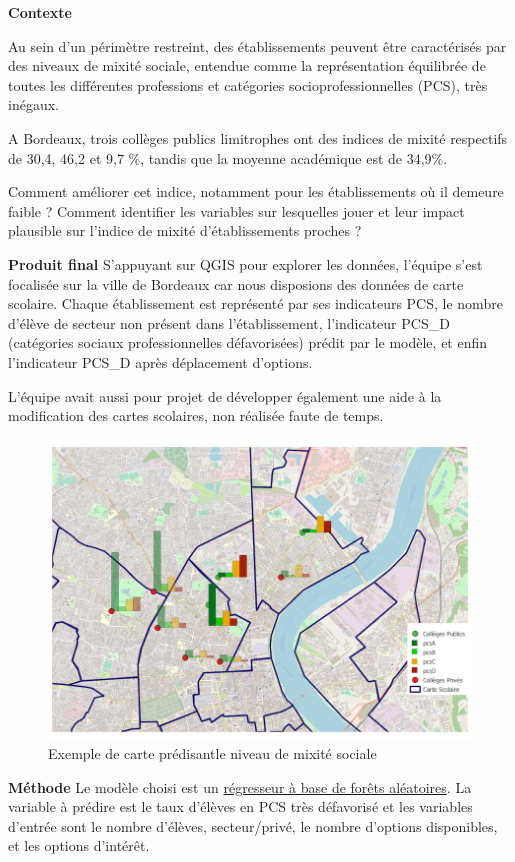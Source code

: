 \documentclass[]{book}
\begin{document}
\textbf{Contexte}

Au sein d'un périmètre restreint, des établissements peuvent être
caractérisés par des niveaux de mixité sociale, entendue comme la
représentation équilibrée de toutes les différentes professions et
catégories socioprofessionnelles (PCS), très inégaux.

A Bordeaux, trois collèges publics limitrophes ont des indices de mixité
respectifs de 30,4, 46,2 et 9,7 \%, tandis que la moyenne académique est
de 34,9\%.

Comment améliorer cet indice, notamment pour les établissements où il
demeure faible ? Comment identifier les variables sur lesquelles jouer
et leur impact plausible sur l'indice de mixité d'établissements proches
?

\textbf{Produit final} S'appuyant sur QGIS pour explorer les données,
l'équipe s'est focalisée sur la ville de Bordeaux car nous disposions
des données de carte scolaire. Chaque établissement est représenté par
ses indicateurs PCS, le nombre d'élève de secteur non présent dans
l'établissement, l'indicateur PCS\_D (catégories sociaux
professionnelles défavorisées) prédit par le modèle, et enfin
l'indicateur PCS\_D après déplacement d'options.

L'équipe avait aussi pour projet de développer également une aide à la
modification des cartes scolaires, non réalisée faute de temps.

\begin{figure}

{\centering \includegraphics[width=0.6\linewidth]{./img/Diagramme_Publics_Prives} 

}

\caption{Exemple de carte prédisantle  niveau de mixité sociale}\label{fig:unnamed-chunk-2}
\end{figure}

\textbf{Méthode} Le modèle choisi est un
\href{https://fr.wikipedia.org/wiki/For\%C3\%AAt_d\%27arbres_d\%C3\%A9cisionnels}{régresseur
à base de forêts aléatoires}. La variable à prédire est le taux d'élèves
en PCS très défavorisé et les variables d'entrée sont le nombre
d'élèves, secteur/privé, le nombre d'options disponibles, et les options
d'intérêt.
\end{document}
